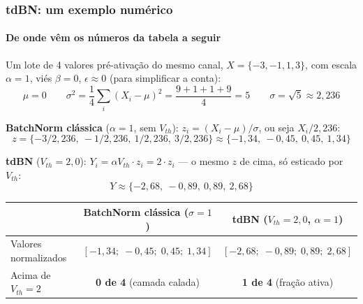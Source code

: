 \begin{frame}[shrink]
	\frametitle{tdBN: um exemplo numérico}
	\framesubtitle{De onde vêm os números da tabela a seguir}
	\small
	\par Um lote de 4 valores pré-ativação do mesmo canal, $X = \{-3,-1,1,3\}$, com escala $\alpha=1$, viés $\beta=0$, $\epsilon \approx 0$ (para simplificar a conta):
	\begin{equation*}
		\mu = 0
		\qquad
		\sigma^2 = \frac{1}{4}\sum_i (X_i-\mu)^2 = \frac{9+1+1+9}{4} = 5
		\qquad
		\sigma = \sqrt{5} \approx 2{,}236
	\end{equation*}
	\par \textbf{BatchNorm clássica} ($\alpha=1$, sem $V_{th}$): $z_i = (X_i-\mu)/\sigma$, ou seja $X_i/2{,}236$:
	\begin{equation*}
		z = \{-3/2{,}236,\ -1/2{,}236,\ 1/2{,}236,\ 3/2{,}236\} \approx \{-1{,}34,\ -0{,}45,\ 0{,}45,\ 1{,}34\}
	\end{equation*}
	\par \textbf{tdBN} ($V_{th}=2{,}0$): $Y_i = \alpha V_{th}\cdot z_i = 2\cdot z_i$ --- o mesmo $z$ de cima, só esticado por $V_{th}$:
	\begin{equation*}
		Y \approx \{-2{,}68,\ -0{,}89,\ 0{,}89,\ 2{,}68\}
	\end{equation*}
	\begin{center}
		\footnotesize
		\begin{tabular}{lcc}
			\toprule
			& \textbf{BatchNorm clássica ($\sigma=1$)} & \textbf{tdBN ($V_{th}=2{,}0$, $\alpha=1$)} \\
			\midrule
			Valores normalizados & $[-1{,}34;\; -0{,}45;\; 0{,}45;\; 1{,}34]$ & $[-2{,}68;\; -0{,}89;\; 0{,}89;\; 2{,}68]$ \\
			Acima de $V_{th}=2$ & \textbf{0 de 4} (camada calada) & \textbf{1 de 4} (fração ativa) \\
			\bottomrule
		\end{tabular}
	\end{center}
\end{frame}

